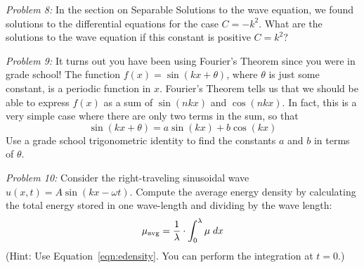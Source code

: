 \documentclass[12pt]{article}
\begin{document}
\vskip 0.5cm

\noindent
{\em Problem 8:}
In the section on Separable Solutions to the wave equation, we found solutions to the differential equations for the case $C=-k^2$.  What are the solutions to the wave equation if this constant is positive $C=k^2$?

\vskip 0.5cm

\noindent
{\em Problem 9:}   It turns out you have been using Fourier's Theorem since you were in grade school!  The function $f(x) = \sin(kx + \theta)$, where $\theta$ is just some constant, is a periodic function in $x$.  Fourier's Theorem tells us that we should be able to express $f(x)$ as a sum of $\sin(nkx)$ and $\cos(nkx)$.  In fact, this is a very simple case where there are only two terms in the sum, so that
\begin{displaymath}
\sin(kx+\theta) = a \sin(kx) + b \cos(kx)
\end{displaymath}
Use a grade school trigonometric identity to find the constants $a$ and $b$ in terms of $\theta$. \\

\vskip 1cm

\noindent
{\em Problem 10:}  Consider the right-traveling sinusoidal wave $u(x,t) = A \sin(kx - \omega t)$.  Compute the average energy density by calculating the total energy stored in one wave-length and dividing by the wave length:
\begin{displaymath}
\mu_{\rm avg} = \frac{1}{\lambda} \cdot \int_0^\lambda \mu \; dx
\end{displaymath}
(Hint: Use Equation~\ref{eqn:edensity}.  You can perform the integration at $t=0$.) 
\end{document}

